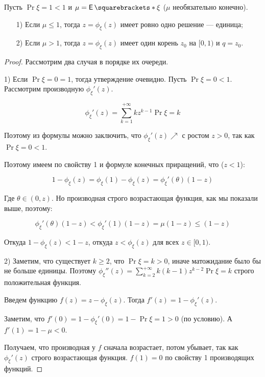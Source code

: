 \begin{theorem}
  Пусть $\Pr{\xi = 1} < 1$ и $\mu = \E{\xi}$ ($\mu$ необязательно конечно).

  \begin{itemize}
    \item[1)] Если $\mu \leq 1$, тогда $z = \phi_{\xi}(z)$  имеет ровно одно 
    решение --- единица;
    \item[2)] Если $\mu > 1$, тогда  $z = \phi_{\xi}(z)$ имеет один корень 
    $z_0$ на $[0, 1)$ и $q = z_0$.
  \end{itemize}
\end{theorem}

\begin{proof}
  Рассмотрим два случая в порядке их очереди.

  1) Если $\Pr{\xi = 0} = 1$, тогда утверждение очевидно. Пусть $\Pr{\xi = 0} < 1$.
  Рассмотрим производную $\phi_{\xi}'(z)$.

  \[
    \phi_{\xi}'(z) = \sum\limits_{k = 1}^{+\infty} kz^{k - 1}\Pr{\xi = k}
  \]

  Поэтому из формулы можно заключить, что $\phi_{\xi}'(z) \nearrow$ с ростом 
  $z > 0$, так как $\Pr{\xi = 0} < 1$.

  Поэтому имеем по свойству 1 и формуле конечных приращений, что ($z < 1$):

  \[
    1 - \phi_{\xi}(z) = \phi_{\xi}(1) - \phi_{\xi}(z) = \phi_{\xi}'(\theta)(1 - z)
  \]

  Где $\theta \in (0, z)$. Но производная строго возрастающая функция, как мы показали
  выше, поэтому:

  \[
    \phi_{\xi}'(\theta)(1 - z) < \phi_{\xi}'(1)(1 - z) = \mu (1 - z) \leq (1 - z)
  \]

  Откуда $1 - \phi_{\xi}(z) < 1 - z$, откуда $z < \phi_{\xi}(z)$ для всех $z \in [0, 1)$.

  2) Заметим, что существует $k \geq 2$, что $\Pr{\xi = k} > 0$, иначе матожидание
  было бы не больше единицы. Поэтому $\phi_{\xi}''(z) = \sum\limits_{k = 2}^{+\infty}
  k(k - 1)z^{k - 2}\Pr{\xi = k}$ строго положительная функция.

  Введем функцию $f(z) = z - \phi_{\xi}(z)$. Тогда $f'(z) = 1 - \phi_{\xi}'(z)$.

  Заметим, что $f'(0) = 1 - \phi_{\xi}'(0) = 1 - \Pr{\xi = 1} > 0$ (по условию).
  А $f'(1) =  1 - \mu < 0$.

  Получаем, что производная у $f$ сначала возрастает, потом убывает, так как
  $\phi_{\xi}'(z)$ строго возрастающая функция. $f(1) = 0$ по свойству 1 
  производящих функций.


\end{proof}
